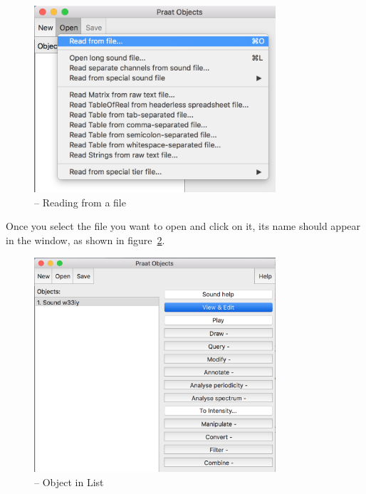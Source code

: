 \begin{figure}[!tbp]
\caption{\Praat{} -- Reading from a file}
\label{praat-read-from-file}
	\begin{center}
		\includegraphics[width=0.8\textwidth]{./figures/Praat-03-Read-from-file}
	\end{center}
\end{figure}

Once you select the file you want to open and click on it, its name should appear in the  window, as shown in figure~\ref{praat-object-in-list}.

\begin{figure}[!tbp]
\caption{\Praat{} -- Object in List}
\label{praat-object-in-list}
	\begin{center}
		\includegraphics[width=0.8\textwidth]{./figures/Praat-04-Object-in-list}
	\end{center}
\end{figure}

